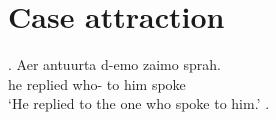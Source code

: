 
\chapter{Case attraction}


\exg. Aer antuurta d-emo zaimo sprah.\\
he replied who- {to him} spoke\\
`He replied to the one who spoke to him.'
\z.

\phantom{x}
